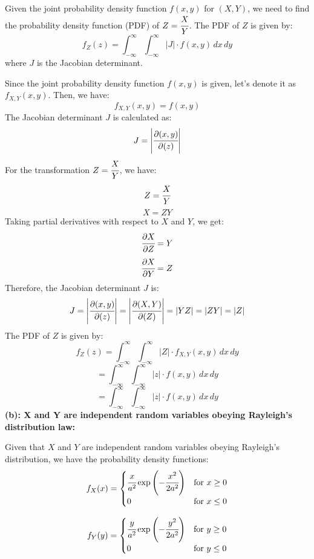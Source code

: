 \documentclass{article}
\begin{document}
\begin{enumerate}
    Given the joint probability density function \( f(x, y) \) for \( (X, Y) \), we need to find the probability density function (PDF) of \( Z = \cfrac{X}{Y} \).
    The PDF of \( Z \) is given by:
    \[ 
        f_Z(z) = \int_{-\infty}^{\infty} \int_{-\infty}^{\infty} |J| \cdot f(x, y) \,dx \,dy 
    \]
    where \( J \) is the Jacobian determinant.

    Since the joint probability density function \( f(x, y) \) is given, let's denote it as \( f_{X,Y}(x, y) \). Then, we have:
    \[ 
        f_{X,Y}(x, y) = f(x, y) 
    \]
    The Jacobian determinant \( J \) is calculated as:
    \[ 
        J = \left| \cfrac{\partial(x, y)}{\partial(z)} \right| 
    \]
    For the transformation \( Z = \cfrac{X}{Y} \), we have:
    \[ Z = \cfrac{X}{Y} \]
    \[ X = ZY \]
    Taking partial derivatives with respect to \( X \) and \( Y \), we get:
    \[ 
        \cfrac{\partial X}{\partial Z} = Y 
    \]
    \[ 
        \cfrac{\partial X}{\partial Y} = Z 
    \]
    Therefore, the Jacobian determinant \( J \) is:
    \[ 
        J = \left| \cfrac{\partial(x, y)}{\partial(z)} \right| = \left| \cfrac{\partial(X, Y)}{\partial(Z)} \right| = |YZ| = |ZY| = |Z| 
    \]
    The PDF of \( Z \) is given by:
    \[
        f_Z(z) = \int_{-\infty}^{\infty} \int_{-\infty}^{\infty} |Z| \cdot f_{X,Y}(x, y) \,dx \,dy
    \]
    \[
         = \int_{-\infty}^{\infty} \int_{-\infty}^{\infty} |z| \cdot f(x, y) \,dx \,dy
    \]
    \[ 
        = \int_{-\infty}^{\infty} \int_{-\infty}^{\infty} |z| \cdot f(x, y) \,dx \,dy 
    \]
    \newpage
    \textbf{(b): X and Y are independent random variables obeying Rayleigh’s distribution law:}

    Given that \( X \) and \( Y \) are independent random variables obeying Rayleigh's distribution, we have the probability density functions:
    \[ 
        f_X(x) = \begin{cases} \cfrac{x}{a^2} \exp\left(-\cfrac{x^2}{2a^2}\right) & \text{for } x \geq 0 \\ 0 & \text{for } x \leq 0 \end{cases} \]

    \[ 
        f_Y(y) = \begin{cases} \cfrac{y}{a^2} \exp\left(-\cfrac{y^2}{2a^2}\right) & \text{for } y \geq 0 \\ 0 & \text{for } y \leq 0 \end{cases} \]


\end{enumerate}
\end{document}
